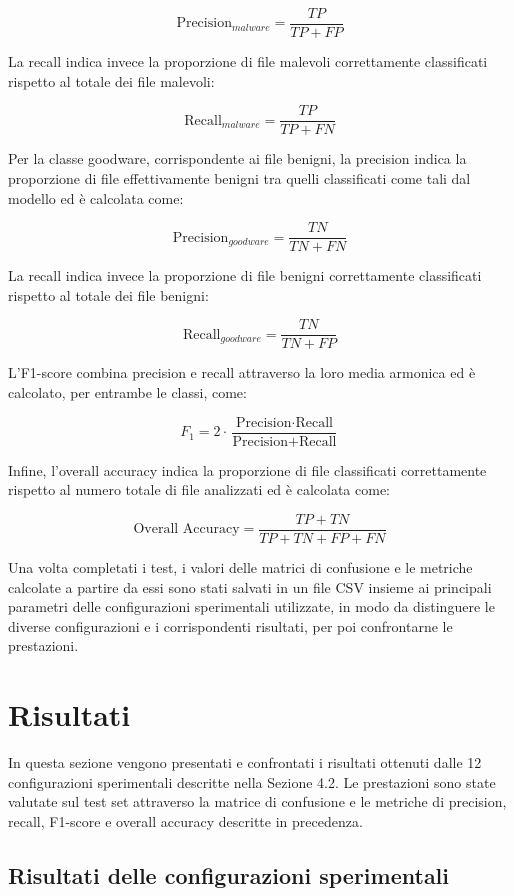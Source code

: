 \[
\text{Precision}_{malware} =
\frac{TP}{TP + FP}
\]

La recall indica invece la proporzione di file malevoli correttamente
classificati rispetto al totale dei file malevoli:

\[
\text{Recall}_{malware} =
\frac{TP}{TP + FN}
\]

Per la classe goodware, corrispondente ai file benigni, la precision
indica la proporzione di file effettivamente benigni tra quelli
classificati come tali dal modello ed è calcolata come:

\[
\text{Precision}_{goodware} =
\frac{TN}{TN + FN}
\]

La recall indica invece la proporzione di file benigni correttamente
classificati rispetto al totale dei file benigni:

\[
\text{Recall}_{goodware} =
\frac{TN}{TN + FP}
\]

L'F1-score combina precision e recall attraverso la loro media
armonica ed è calcolato, per entrambe le classi, come:

\[
F_1 =
2 \cdot
\frac{\text{Precision} \cdot \text{Recall}}
{\text{Precision} + \text{Recall}}
\]

Infine, l'overall accuracy indica la proporzione di file classificati
correttamente rispetto al numero totale di file analizzati ed è
calcolata come:

\[
\text{Overall Accuracy} =
\frac{TP + TN}{TP + TN + FP + FN}
\]

Una volta completati i test, i valori delle matrici di confusione
e le metriche calcolate a partire da essi sono stati salvati in un
file CSV insieme ai principali parametri delle configurazioni
sperimentali utilizzate, in modo da distinguere le diverse
configurazioni e i corrispondenti risultati, per poi confrontarne
le prestazioni.

\section{Risultati}

In questa sezione vengono presentati e confrontati i risultati
ottenuti dalle 12 configurazioni sperimentali descritte nella
Sezione 4.2. Le prestazioni sono state valutate sul test set
attraverso la matrice di confusione e le metriche di precision,
recall, F1-score e overall accuracy descritte in precedenza.

\subsection{Risultati delle configurazioni sperimentali}

